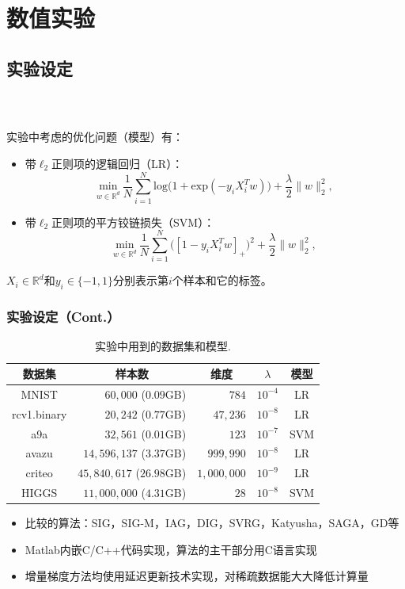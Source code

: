 \section{数值实验}
\subsection{实验设定}

  \frame
  {
    \frametitle{\subsecname~ }
    \footnotesize
    实验中考虑的优化问题（模型）有：
    \begin{itemize}
        \item 带$\ell_2$正则项的逻辑回归（LR）：
        $$
          \underset{w \in \mathbb{R}^d}{\text{min}} \ \frac{1}{N} \sum_{i=1}^{N}
          \text{log}\big( 1 + \text{exp}(-y_i X_i^T w) \big) + \frac{\lambda}{2} \|w\|_2^2,
        $$
        \item 带$\ell_2$正则项的平方铰链损失（SVM）：
        $$
           \underset{w \in \mathbb{R}^d}{\text{min}} \ \frac{1}{N} \sum_{i=1}^{N}
           \big( [1 - y_i X_i^T w]_{+} \big)^2 + \frac{\lambda}{2} \|w\|_2^2,
        $$
    \end{itemize}
    $X_i \in \mathbb{R}^d$和$y_i \in \{ -1, 1\}$分别表示第$i$个样本和它的标签。
  }

  \frame
  {
    \frametitle{实验设定（Cont.）}
    \footnotesize
    \begin{table}[H]
      \centering
      \caption{实验中用到的数据集和模型{\color{white}.}} \label{tb:dataset}
      \begin{tabular}{|c|r|r|c|c|}
        \hline
        数据集          & \multicolumn{1}{c|}{样本数}       & \multicolumn{1}{c|}{维度} & $\lambda$   & 模型 \\ \hline
        MNIST          & $60,000$ ($0.09$GB)              & $784$                  & $10^{-4}$     & LR \\
        rcv1.binary    & $20,242$ ($0.77$GB)              & $47,236$               & $10^{-8}$     & LR  \\
        a9a            & $32,561$ ($0.01$GB)              & $123$                  & $10^{-7}$     & SVM  \\
        avazu          & $14,596,137$ ($3.37$GB)          & $999,990$              & $10^{-8}$     & LR  \\
        criteo         & $45,840,617$ ($26.98$GB)         & $1,000,000$            & $10^{-9}$     & LR  \\
        HIGGS          & $11,000,000$ ($4.31$GB)          & $28$                   & $10^{-8}$     & SVM  \\
        \hline
      \end{tabular}
    \end{table}

\pause

    \begin{itemize}
        \item 比较的算法：SIG，SIG-M，IAG，DIG，SVRG，Katyusha，SAGA，GD等
        \item Matlab内嵌C/C++代码实现，算法的主干部分用C语言实现
        \item 增量梯度方法均使用延迟更新技术实现，对稀疏数据能大大降低计算量
    \end{itemize}
  }


